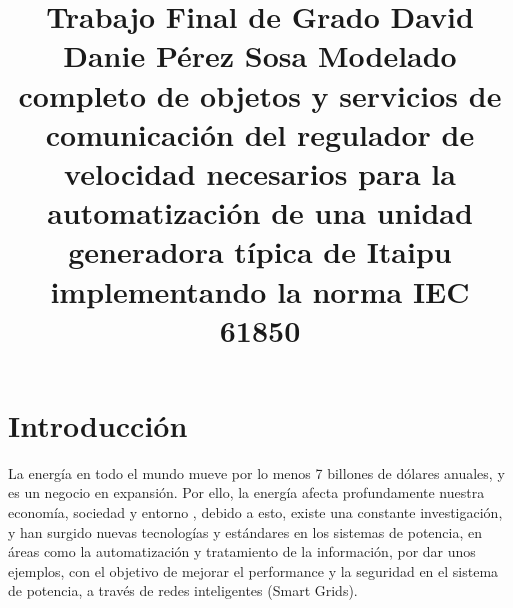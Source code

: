 \documentclass[conference,twocolumn]{IEEEtran}
\begin{document}
\title{Trabajo Final de Grado  David Danie P\'erez Sosa}

\title{
	Modelado completo de objetos y servicios de comunicaci\'on del regulador de velocidad necesarios para la automatizaci\'on de una unidad generadora t\'ipica de Itaipu implementando la norma IEC 61850
}

\author{
}



\maketitle




\IEEEpeerreviewmaketitle







\section{Introducci\'on}

La energ\'ia en todo el mundo mueve por lo menos 7 billones de d\'olares anuales, y es un negocio en expansi\'on. Por ello, la energ\'ia afecta profundamente nuestra econom\'ia, sociedad y entorno \cite{Dukert2009}, debido a esto, existe una constante investigaci\'on, y han surgido nuevas tecnolog\'ias y est\'andares en los sistemas de potencia, en \'areas como la automatizaci\'on y tratamiento de la informaci\'on, por dar unos ejemplos, con el objetivo de mejorar el performance y la seguridad en el sistema de potencia, a trav\'es de redes inteligentes (Smart Grids).\\
\end{document}
